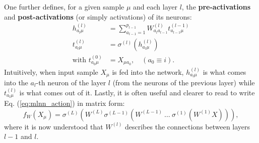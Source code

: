 \documentclass{article}
\begin{document}
One further defines, for a given sample $\mu$ and each layer $l$, the \textbf{pre-activations} and \textbf{post-activations} (or simply activations) of its neurons:
\begin{align}
    h^{(l)}_{a_{l}\mu} &=
    \sum_{a_{l-1}=1}^{p_{l-1}} W^{(l)}_{a_{l}a_{l-1}} t^{(l-1)}_{a_{l-1}\mu} \\
    t^{(l)}_{a_{l}\mu} &=
    \sigma^{(l)}(h^{(l)}_{a_{l}\mu}) \\
    \text{with } t^{(0)}_{a_0\mu} &= X_{\mu a_0}, \quad (a_0 \equiv i).
\end{align}
Intuitively, when input sample $X_{\mu}$ is fed into the network, $h^{(l)}_{a_{l}\mu}$ is what comes into the $a_l$-th neuron of the layer $l$ (from the neurons of the previous layer) while $t^{(l)}_{a_{l}\mu}$ is what comes out of it.
Lastly, it is often useful and clearer to read to write Eq. (\ref{eq:mlnn_action}) in matrix form:
\begin{equation}
    f_W(X_{\mu})
    =
    \sigma^{(L)}\left(
        W^{(L)}
        \sigma^{(L-1)}\left(
            W^{(L-1)}
            \ \dots \ 
            \sigma^{(1)}\left(
            W^{(1)} X
            \right)
        \right)
    \right),
    \label{eq:mlnn_action_matrix}
\end{equation}
where it is now understood that $W^{(l)}$ describes the connections between layers $l-1$ and $l$.
\end{document}
